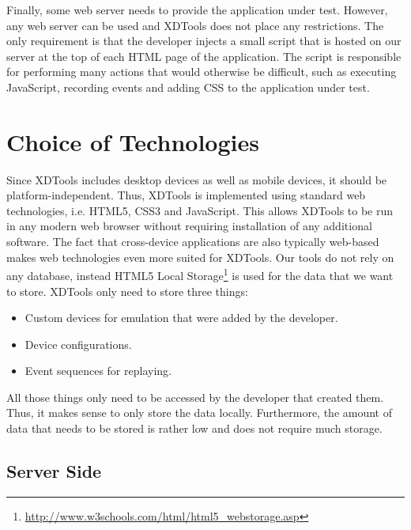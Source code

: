 Finally, some web server needs to provide the application under test. However, any web server can be used and XDTools does not place any restrictions. The only requirement is that the developer injects a small script that is hosted on our server at the top of each HTML page of the application. The script is responsible for performing many actions that would otherwise be difficult, such as executing JavaScript, recording events and adding CSS to the application under test.

\section{Choice of Technologies}

Since XDTools includes desktop devices as well as mobile devices, it should be platform-independent. Thus, XDTools is implemented using standard web technologies, i.e. HTML5, CSS3 and JavaScript. This allows XDTools to be run in any modern web browser without requiring installation of any additional software. The fact that cross-device applications are also typically web-based makes web technologies even more suited for XDTools. Our tools do not rely on any database, instead HTML5 Local Storage\footnote{\url{http://www.w3schools.com/html/html5_webstorage.asp}} is used for the data that we want to store. XDTools only need to store three things:
\begin{itemize}
	\item Custom devices for emulation that were added by the developer.
	\item Device configurations.
	\item Event sequences for replaying.
\end{itemize}
All those things only need to be accessed by the developer that created them. Thus, it makes sense to only store the data locally. Furthermore, the amount of data that needs to be stored is rather low and does not require much storage. 

\subsection{Server Side}

